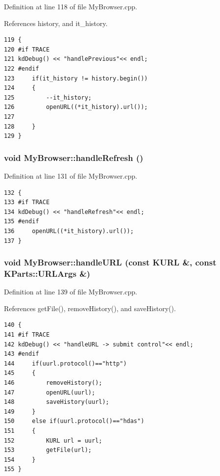 Definition at line 118 of file My\-Browser.cpp.

References history, and it\_\-history.



\footnotesize\begin{verbatim}119 {
120 #if TRACE 
121 kdDebug() << "handlePrevious"<< endl;
122 #endif
123     if(it_history != history.begin())
124     {
125         --it_history;
126         openURL((*it_history).url());
127 
128     }   
129 }
\end{verbatim}\normalsize 
{}
\subsubsection{\setlength{\rightskip}{0pt plus 5cm}void My\-Browser::handle\-Refresh ()\hspace{0.3cm}{\tt  [slot]}}\label{classMyBrowser_MyBrowseri1}




Definition at line 131 of file My\-Browser.cpp.



\footnotesize\begin{verbatim}132 {
133 #if TRACE 
134 kdDebug() << "handleRefresh"<< endl;
135 #endif    
136     openURL((*it_history).url());
137 }
\end{verbatim}\normalsize 
{}
\subsubsection{\setlength{\rightskip}{0pt plus 5cm}void My\-Browser::handle\-URL (const KURL \&, const KParts::URLArgs \&)\hspace{0.3cm}{\tt  [slot]}}\label{classMyBrowser_MyBrowseri4}




Definition at line 139 of file My\-Browser.cpp.

References get\-File(), remove\-History(), and save\-History().



\footnotesize\begin{verbatim}140 {
141 #if TRACE 
142 kdDebug() << "handleURL -> submit control"<< endl;
143 #endif
144     if(uurl.protocol()=="http")
145     {
146         removeHistory();
147         openURL(uurl);
148         saveHistory(uurl);
149     }   
150     else if(uurl.protocol()=="hdas")
151     {           
152         KURL url = uurl;
153         getFile(url);
154     }
155 }
\end{verbatim}\normalsize 
{}
